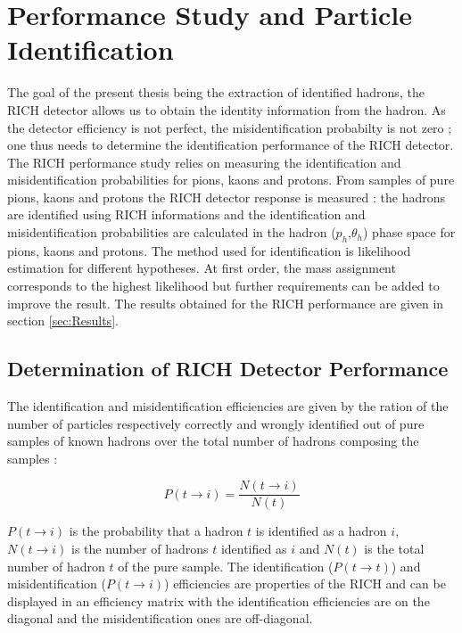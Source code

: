 
\chapter{Performance Study and Particle Identification}
\label{ch:PID} %


The goal of the present thesis being the extraction of identified hadrons, the RICH detector allows us to obtain the identity information from the hadron.
As the detector efficiency is not perfect, the misidentification probabilty is not zero ; one thus needs to determine the identification performance of the
RICH detector.
The RICH performance study relies on measuring the identification and misidentification probabilities for pions, kaons and protons. From samples of pure pions,
kaons and protons the RICH detector response is measured : the hadrons are identified using RICH informations and the identification and misidentification
probabilities are calculated in the hadron ($p_h$,$\theta_h$) phase space for pions, kaons and protons. The method used for identification is likelihood estimation
for different hypotheses. At first order, the mass assignment corresponds to the highest likelihood but further requirements can be added to improve the result.
The results obtained for the RICH performance are given in section \ref{sec:Results}.

\section{Determination of RICH Detector Performance}

The identification and misidentification efficiencies are given by the ration of the number of particles respectively correctly and wrongly identified out of pure
samples of known hadrons over the total number of hadrons composing the samples :

\begin{equation}
    P(t \rightarrow i) = \frac{N(t \rightarrow i)}{N(t)}
\end{equation}

$P(t \rightarrow i)$ is the probability that a hadron $t$ is identified as a hadron $i$, $N(t \rightarrow i)$ is the number of hadrons $t$ identified as $i$ and $N(t)$ is the total number of hadron $t$ of the pure sample. The identification ($P(t \rightarrow t)$) and misidentification ($P(t \rightarrow i)$) efficiencies are properties of the RICH and can be displayed in an efficiency matrix with the identification efficiencies are on the diagonal and the misidentification ones are off-diagonal.

